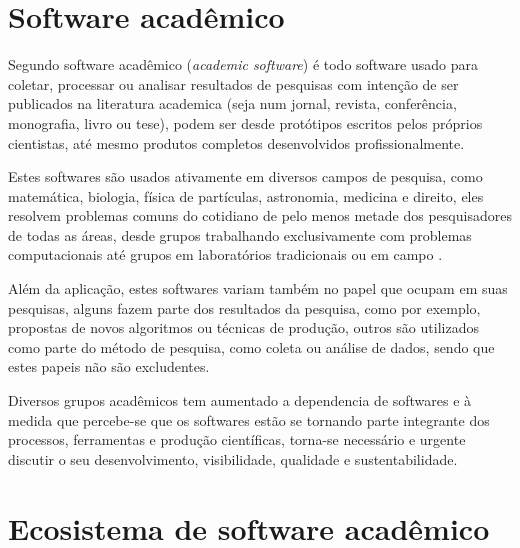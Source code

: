 \section{Software acadêmico}

Segundo  software acadêmico ({\it academic
software}) é todo software usado para coletar, processar ou analisar resultados
de pesquisas com intenção de ser publicados na literatura academica (seja num
jornal, revista, conferência, monografia, livro ou tese), podem ser desde
protótipos escritos pelos próprios cientistas, até mesmo produtos completos
desenvolvidos profissionalmente.

Estes softwares são usados ativamente em diversos campos de pesquisa, como
matemática, biologia, física de partículas, astronomia, medicina e direito,
eles resolvem problemas comuns do cotidiano de pelo menos metade dos
pesquisadores de todas as áreas, desde grupos trabalhando exclusivamente com
problemas computacionais até grupos em laboratórios tradicionais ou em campo
\cite{wilson2014best}.

Além da aplicação, estes softwares variam também no papel que ocupam em suas
pesquisas, alguns fazem parte dos resultados da pesquisa, como por exemplo,
propostas de novos algoritmos ou técnicas de produção, outros são utilizados
como parte do método de pesquisa, como coleta ou análise de dados, sendo que
estes papeis não são excludentes.


Diversos grupos acadêmicos tem aumentado a dependencia de softwares e à medida
que percebe-se que os softwares estão se tornando parte integrante dos
processos, ferramentas e produção científicas, torna-se necessário e urgente
discutir o seu desenvolvimento, visibilidade, qualidade e sustentabilidade.


\section{Ecosistema de software acadêmico}

